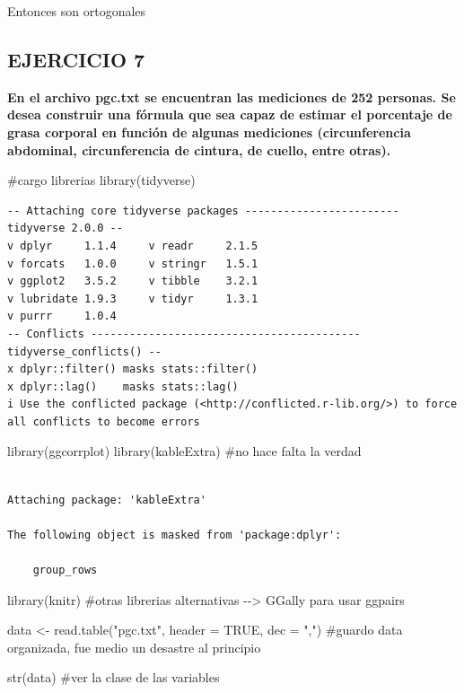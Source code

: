 \documentclass[
  letterpaper,
  DIV=11,
  numbers=noendperiod]{scrartcl}
\newenvironment{Shaded}{\begin{snugshade}}{\end{snugshade}}
\newcommand{\AttributeTok}[1]{\textcolor[rgb]{0.40,0.45,0.13}{#1}}
\newcommand{\CommentTok}[1]{\textcolor[rgb]{0.37,0.37,0.37}{#1}}
\newcommand{\ConstantTok}[1]{\textcolor[rgb]{0.56,0.35,0.01}{#1}}
\newcommand{\FunctionTok}[1]{\textcolor[rgb]{0.28,0.35,0.67}{#1}}
\newcommand{\NormalTok}[1]{\textcolor[rgb]{0.00,0.23,0.31}{#1}}
\newcommand{\OtherTok}[1]{\textcolor[rgb]{0.00,0.23,0.31}{#1}}
\newcommand{\StringTok}[1]{\textcolor[rgb]{0.13,0.47,0.30}{#1}}
\begin{document}
Entonces son ortogonales

\hypertarget{ejercicio-7}{%
\subsection{EJERCICIO 7}\label{ejercicio-7}}

\textbf{En el archivo pgc.txt se encuentran las mediciones de 252
personas. Se desea construir una fórmula que sea capaz de estimar el
porcentaje de grasa corporal en función de algunas mediciones
(circunferencia abdominal, circunferencia de cintura, de cuello, entre
otras).}

\begin{Shaded}
\begin{Highlighting}[]
\CommentTok{\#cargo librerias}
\FunctionTok{library}\NormalTok{(tidyverse)}
\end{Highlighting}
\end{Shaded}

\begin{verbatim}
-- Attaching core tidyverse packages ------------------------ tidyverse 2.0.0 --
v dplyr     1.1.4     v readr     2.1.5
v forcats   1.0.0     v stringr   1.5.1
v ggplot2   3.5.2     v tibble    3.2.1
v lubridate 1.9.3     v tidyr     1.3.1
v purrr     1.0.4     
-- Conflicts ------------------------------------------ tidyverse_conflicts() --
x dplyr::filter() masks stats::filter()
x dplyr::lag()    masks stats::lag()
i Use the conflicted package (<http://conflicted.r-lib.org/>) to force all conflicts to become errors
\end{verbatim}

\begin{Shaded}
\begin{Highlighting}[]
\FunctionTok{library}\NormalTok{(ggcorrplot)}
\FunctionTok{library}\NormalTok{(kableExtra) }\CommentTok{\#no hace falta la verdad}
\end{Highlighting}
\end{Shaded}

\begin{verbatim}

Attaching package: 'kableExtra'

The following object is masked from 'package:dplyr':

    group_rows
\end{verbatim}

\begin{Shaded}
\begin{Highlighting}[]
\FunctionTok{library}\NormalTok{(knitr)}
\CommentTok{\#otras librerias alternativas {-}{-}\textgreater{} GGally para usar ggpairs}

\NormalTok{data }\OtherTok{\textless{}{-}} \FunctionTok{read.table}\NormalTok{(}\StringTok{"pgc.txt"}\NormalTok{, }\AttributeTok{header =} \ConstantTok{TRUE}\NormalTok{, }\AttributeTok{dec =} \StringTok{","}\NormalTok{) }
\CommentTok{\#guardo data organizada, fue medio un desastre al principio}

\FunctionTok{str}\NormalTok{(data) }\CommentTok{\#ver la clase de las variables}
\end{Highlighting}
\end{Shaded}
\end{document}
